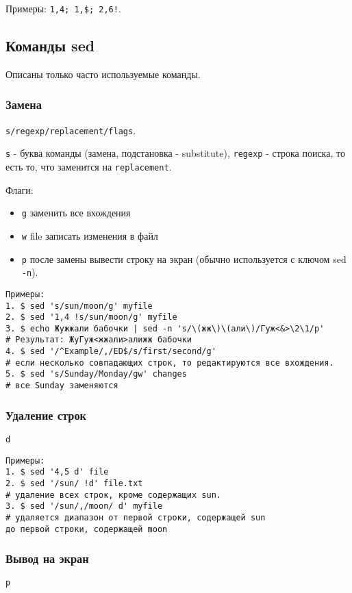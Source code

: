 Примеры: \verb+1,4; 1,$; 2,6!+.

\subsection{Команды sed}

Описаны только часто используемые команды.

\subsubsection{Замена} 

\verb+s/regexp/replacement/flags+. 

\verb+s+ - буква команды (замена, подстановка - substitute), \verb+regexp+ - строка поиска, то есть то, что заменится на \verb+replacement+. 

Флаги:
\begin{itemize}
\item \verb+g+  заменить все вхождения
\item \verb+w+ file  записать изменения в файл
\item \verb+p+  после замены вывести строку на экран (обычно используется с ключом sed \verb+-n+).      
\end{itemize}
\begin{verbatim}
Примеры: 
1. $ sed 's/sun/moon/g' myfile
2. $ sed '1,4 !s/sun/moon/g' myfile
3. $ echo Жужжали бабочки | sed -n 's/\(жж\)\(али\)/Гуж<&>\2\1/p'
# Результат: ЖуГуж<жжали>алижж бабочки
4. $ sed '/^Example/,/ED$/s/first/second/g' 
# если несколько совпадающих строк, то редактируются все вхождения.
5. $ sed 's/Sunday/Monday/gw' changes
# все Sunday заменяются
\end{verbatim}

\subsubsection{Удаление строк}
\verb+d+
\begin{verbatim}
Примеры: 
1. $ sed '4,5 d' file
2. $ sed '/sun/ !d' file.txt 
# удаление всех строк, кроме содержащих sun.
3. $ sed '/sun/,/moon/ d' myfile
# удаляется диапазон от первой строки, содержащей sun
до первой строки, содержащей moon
\end{verbatim}

\subsubsection{Вывод на экран}
\verb=p=  

